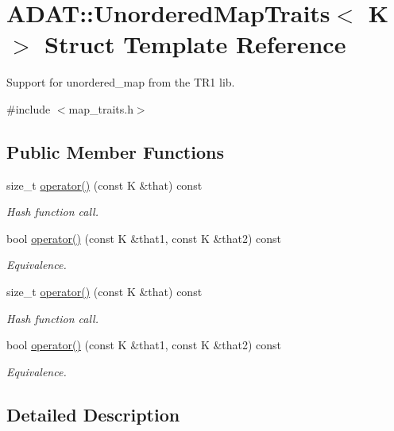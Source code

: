 \hypertarget{structADAT_1_1UnorderedMapTraits}{}\section{A\+D\+AT\+:\+:Unordered\+Map\+Traits$<$ K $>$ Struct Template Reference}
\label{structADAT_1_1UnorderedMapTraits}


Support for unordered\+\_\+map from the T\+R1 lib.  




{\ttfamily \#include $<$map\+\_\+traits.\+h$>$}

\subsection*{Public Member Functions}
\begin{DoxyCompactItemize}
\item 
size\+\_\+t \mbox{\hyperlink{structADAT_1_1UnorderedMapTraits_ab9d8c80fb0f561fdadad5be6263d3f94}{operator()}} (const K \&that) const
\begin{DoxyCompactList}\small\item\em Hash function call. \end{DoxyCompactList}\item 
bool \mbox{\hyperlink{structADAT_1_1UnorderedMapTraits_a14c1daf5e4530fc4c749ec681103e7a2}{operator()}} (const K \&that1, const K \&that2) const
\begin{DoxyCompactList}\small\item\em Equivalence. \end{DoxyCompactList}\item 
size\+\_\+t \mbox{\hyperlink{structADAT_1_1UnorderedMapTraits_ab9d8c80fb0f561fdadad5be6263d3f94}{operator()}} (const K \&that) const
\begin{DoxyCompactList}\small\item\em Hash function call. \end{DoxyCompactList}\item 
bool \mbox{\hyperlink{structADAT_1_1UnorderedMapTraits_a14c1daf5e4530fc4c749ec681103e7a2}{operator()}} (const K \&that1, const K \&that2) const
\begin{DoxyCompactList}\small\item\em Equivalence. \end{DoxyCompactList}\end{DoxyCompactItemize}


\subsection{Detailed Description}
